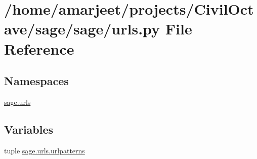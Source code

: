\hypertarget{a00016}{}\section{/home/amarjeet/projects/\+Civil\+Octave/sage/sage/urls.py File Reference}
\label{a00016}
\subsection*{Namespaces}
\begin{DoxyCompactItemize}
\item 
 \hyperlink{a00044}{sage.\+urls}
\end{DoxyCompactItemize}
\subsection*{Variables}
\begin{DoxyCompactItemize}
\item 
tuple \hyperlink{a00044_a5c86cdc04e09bcea3285cc79e9c83220}{sage.\+urls.\+urlpatterns}
\end{DoxyCompactItemize}
